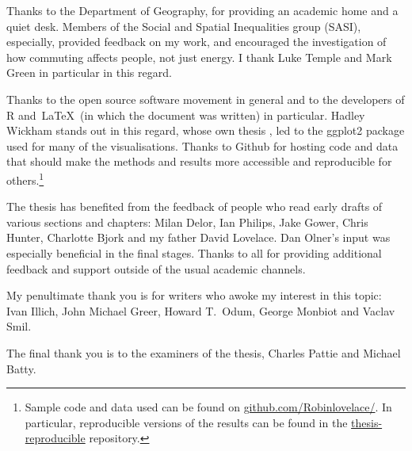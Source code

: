 \documentclass[a4paper, 11pt, twoside]{Thesis}  %
\begin{document}
{Thanks to the Department of Geography, for providing an academic
home and a quiet desk. Members of the Social
and Spatial Inequalities group (SASI), especially, provided
feedback on my work, and encouraged the investigation of
how commuting affects people, not just energy. I thank Luke Temple and Mark
Green in particular in this regard.

Thanks to the open source software movement in general and to the developers
of R and~\LaTeX~(in which the document was written) in particular.
Hadley Wickham stands out in this
regard, whose own thesis \citep{Wickham2008}, led to the ggplot2 package
used for many of the visualisations.
Thanks to Github for hosting code and data that should make the methods
and results more accessible and reproducible for
others.\footnote{Sample code
and data used can be found on {\color{blue} \href{https://github.com/Robinlovelace/}
{github.com/Robinlovelace/}}. In particular, reproducible versions of
the results can be found in the {\color{blue} \href{https://github.com/Robinlovelace/thesis-reproducible}
{thesis-reproducible}} repository. }

The thesis has benefited from the feedback of people who read 
early drafts of various sections and chapters: Milan Delor,
Ian Philips, Jake Gower, Chris Hunter, Charlotte Bjork and my father 
David Lovelace. Dan Olner's input was especially beneficial in the final 
stages. Thanks to all for providing additional feedback and support outside
of the usual academic channels.

My penultimate thank you is for writers who awoke my interest in this topic: Ivan
Illich, John Michael Greer, Howard T.~Odum, George Monbiot and
Vaclav Smil.

The final thank you is to the examiners of the thesis, Charles Pattie and
Michael Batty. 
}
\clearpage  %
\end{document}

